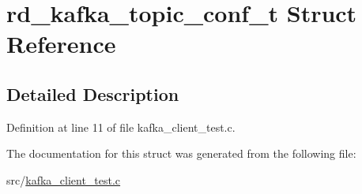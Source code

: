\hypertarget{structrd__kafka__topic__conf__t}{\section{rd\-\_\-kafka\-\_\-topic\-\_\-conf\-\_\-t \-Struct \-Reference}
\label{structrd__kafka__topic__conf__t}
}


\subsection{\-Detailed \-Description}


\-Definition at line 11 of file kafka\-\_\-client\-\_\-test.\-c.



\-The documentation for this struct was generated from the following file\-:\begin{DoxyCompactItemize}
\item 
src/\hyperlink{kafka__client__test_8c}{kafka\-\_\-client\-\_\-test.\-c}\end{DoxyCompactItemize}
